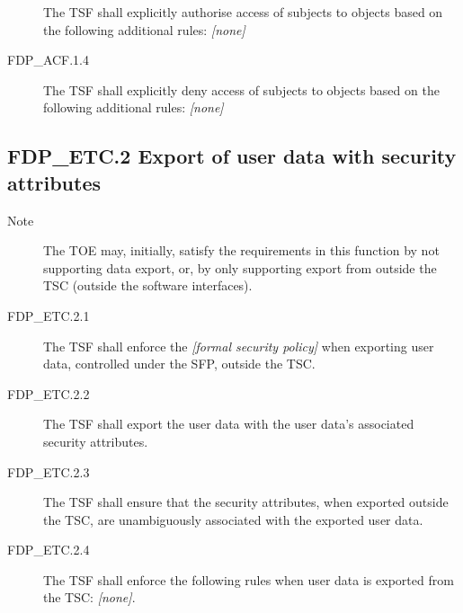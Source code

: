 \documentclass[10pt,a4paper,english]{book}
\begin{document}
\begin{description}
The TSF shall explicitly authorise access of subjects to
objects based on the following additional rules: \emph{{[}none]}

\item[FDP{\_}ACF.1.4]

The TSF shall explicitly deny access of subjects to objects
based on the following additional rules: \emph{{[}none]}

\end{description}



\hypertarget{fdp-etc-2-export-of-user-data-with-security-attributes}{}
\subsection{FDP{\_}ETC.2 Export of user data with security attributes}
\begin{description}
\item[Note]

The TOE may, initially, satisfy the requirements in this
function by not supporting data export, or, by only
supporting export from outside the TSC (outside the
software interfaces).

\item[FDP{\_}ETC.2.1]

The TSF shall enforce the \emph{{[}formal security policy]} when exporting user
data, controlled under the SFP, outside the TSC.

\item[FDP{\_}ETC.2.2]

The TSF shall export the user data with the user data's associated 
security attributes.

\item[FDP{\_}ETC.2.3]

The TSF shall ensure that the security attributes, when 
exported outside the TSC, are unambiguously associated 
with the exported user data.

\item[FDP{\_}ETC.2.4]

The TSF shall enforce the following rules when user data 
is exported from the TSC: \emph{{[}none]}.

\end{description}
\end{document}
